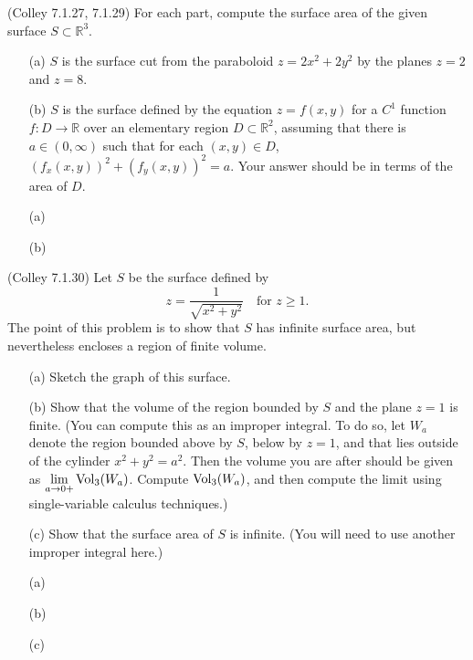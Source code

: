 \documentclass[11pt,letterpaper,cm]{nupset}
\begin{document}
\begin{problem}[Exercise 1]  (Colley 7.1.27, 7.1.29) For each part, compute the surface area of the given surface $S\subset\mathbb{R}^3$.
	\begin{itemize}
		\item[(a)] $S$ is the surface cut from the paraboloid $z=2x^2+2y^2$ by the planes $z=2$ and $z=8$.
		\item[(b)] $S$ is the surface defined by the equation $z=f(x,y)$ for a $C^1$ function $f:D\to\mathbb{R}$ over an elementary region $D\subset\mathbb{R}^2$, assuming that there is $a\in(0,\infty)$ such that for each $(x,y)\in D$, $(f_x(x,y))^2+(f_y(x,y))^2=a$. Your answer should be in terms of the area of $D$.
	\end{itemize}
\end{problem}
\begin{solution}
	\begin{itemize}
		\item[(a)] 
		\item[(b)] 
	\end{itemize}
\end{solution}
\newpage

\begin{problem}[Exercise 2] (Colley 7.1.30) Let $S$ be the surface defined by
	$$z=\frac1{\sqrt{x^2+y^2}} \quad\text{for } z \ge 1.$$
	The point of this problem is to show that $S$ has infinite surface area, but nevertheless encloses a region of finite volume.
	\begin{itemize}
		\item[(a)] Sketch the graph of this surface.
		\item[(b)] Show that the volume of the region bounded by $S$ and the plane $z=1$ is finite. (You can compute this as an improper integral. To do so, let $W_a$ denote the region bounded above by $S$, below by $z=1$, and that lies outside of the cylinder $x^2+y^2=a^2$.  Then the volume you are after should be given as $\lim\limits_{a\to 0+} {\rm Vol}_3(W_a)$.  Compute ${\rm Vol}_3(W_a)$, and then compute the limit using single-variable calculus techniques.)
		\item[(c)] Show that the surface area of $S$ is infinite. (You will need to use another improper integral here.)
	\end{itemize}
\end{problem}
\begin{solution}
		\begin{itemize}
		\item[(a)] 
		\item[(b)] 
		\item[(c)] 
	\end{itemize}
\end{solution}
\newpage
\end{document}
